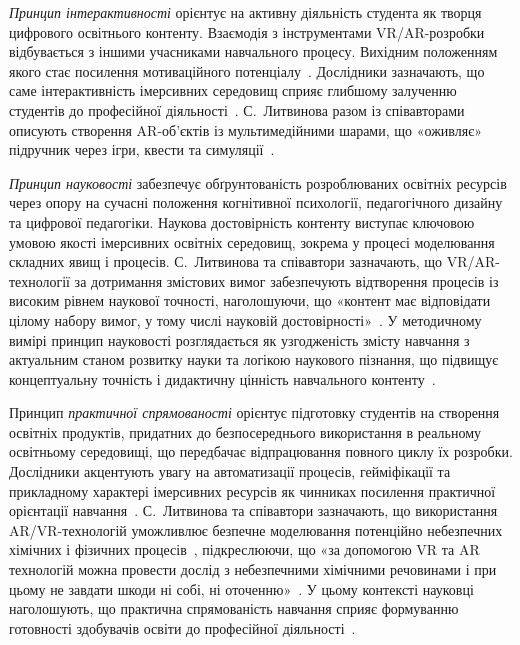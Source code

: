\emph{Принцип інтерактивності} орієнтує на активну діяльність студента як творця цифрового освітнього контенту. Взаємодія з інструментами VR/AR-розробки відбувається з іншими учасниками навчального процесу. Вихідним положенням якого стає посилення мотиваційного потенціалу~\cite{Semerikov2023Motivational}. Дослідники зазначають, що саме інтерактивність імерсивних середовищ сприяє глибшому залученню студентів до професійної діяльності~\cite{Semerikov2022IERDesign}. С.~Литвинова разом із співавторами описують створення AR-об'єктів із мультимедійними шарами, що «оживляє» підручник через ігри, квести та симуляції~\cite[c.~56--57]{Lytvynova2023Monograph}.

\emph{Принцип науковості} забезпечує обґрунтованість розроблюваних освітніх ресурсів через опору на сучасні положення когнітивної психології, педагогічного дизайну та цифрової педагогіки. Наукова достовірність контенту виступає ключовою умовою якості імерсивних освітніх середовищ, зокрема у процесі моделювання складних явищ і процесів. С.~Литвинова та співавтори зазначають, що VR/AR-технології за дотримання змістових вимог забезпечують відтворення процесів із високим рівнем наукової точності, наголошуючи, що «контент має відповідати цілому набору вимог, у тому числі науковій достовірності»~\cite[c.~23--24; 26]{Lytvynova2023Monograph}. У методичному вимірі принцип науковості розглядається як узгодженість змісту навчання з актуальним станом розвитку науки та логікою наукового пізнання, що підвищує концептуальну точність і дидактичну цінність навчального контенту~\cite{Goncharenko2011Pedagogy}.

Принцип \emph{практичної спрямованості} орієнтує підготовку студентів на створення освітніх продуктів, придатних до безпосереднього використання в реальному освітньому середовищі, що передбачає відпрацювання повного циклу їх розробки. Дослідники акцентують увагу на автоматизації процесів, гейміфікації та прикладному характері імерсивних ресурсів як чинниках посилення практичної орієнтації навчання~\cite{Dychkivska2012Innovative}. С.~Литвинова та співавтори зазначають, що використання AR/VR-технологій уможливлює безпечне моделювання потенційно небезпечних хімічних і фізичних процесів~\cite[c.~18; 55]{Lytvynova2023Monograph}, підкреслюючи, що «за допомогою VR та AR технологій можна провести дослід з небезпечними хімічними речовинами і при цьому не завдати шкоди ні собі, ні оточенню»~\cite[c.~30]{Lytvynova2023Monograph}. У цьому контексті науковці наголошують, що практична спрямованість навчання сприяє формуванню готовності здобувачів освіти до професійної діяльності~\cite{Dychkivska2012Innovative}.

